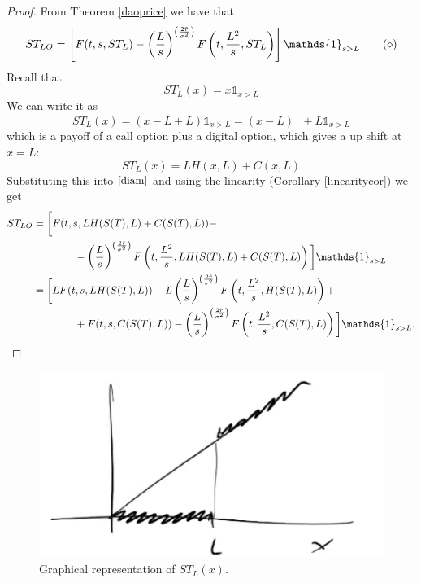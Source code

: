 \begin{proof}
    From Theorem \ref{daoprice} we have that
    \begin{equation}\label{diam}
      ST_{LO} = \left[F(t,s,ST_L) - \left(\frac{L}{s}\right)^{\left(\frac{2\Tilde{r}}{\sigma^2}\right)} F\left(t,\frac{L^2}{s},ST_L\right)\right]\mathds{1}_{s>L} \tag{$\diamond$}
    \end{equation}
    Recall that
    \begin{equation*}
      ST_L(x) = x\mathds{1}_{x>L}
    \end{equation*}
    We can write it as
    \begin{equation*}
      ST_L(x) = (x-L+L)\mathds{1}_{x>L} = (x-L)^+ + L\mathds{1}_{x>L}
    \end{equation*}
    which is a payoff of a call option plus a digital option, which gives a up shift at $x=L$:
    \begin{equation*}
      ST_L(x) = LH(x,L) + C(x,L)
    \end{equation*}
    Substituting this into $\eqref{diam}$ and using the linearity (Corollary \ref{linearitycor}) we get
    \begin{align*}
      ST_{LO} &= \bigg[F(t,s,LH(S(T),L)+C(S(T),L)) - \\
      &\qquad\qquad
      - \left(\frac{L}{s}\right)^{\left(\frac{2\Tilde{r}}{\sigma^2}\right)} F\left(t,\frac{L^2}{s}, LH(S(T),L) + C(S(T),L)\right)\bigg]\mathds{1}_{s>L} \\
      &=
      \bigg[LF(t,s,LH(S(T),L)) - L\left(\frac{L}{s}\right)^{\left(\frac{2\Tilde{r}}{\sigma^2}\right)} F\left(t,\frac{L^2}{s},H(S(T),L)\right) + \\
      &\qquad\qquad
      + F(t,s,C(S(T),L)) - \left(\frac{L}{s}\right)^{\left(\frac{2\Tilde{r}}{\sigma^2}\right)} F\left(t,\frac{L^2}{s},C(S(T),L)\right)\bigg]\mathds{1}_{s>L}.
    \end{align*}
\end{proof}
\begin{figure}[h]
  \centering
  \includegraphics[scale=0.3]{fig/tmp/fig39}
  \caption{Graphical representation of $ST_L(x)$.}
\end{figure}
